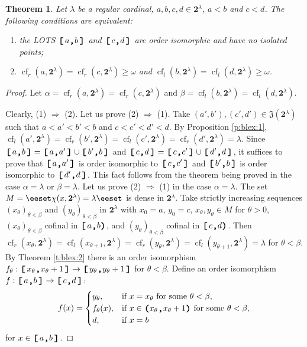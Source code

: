 \documentclass[preprint]{elsarticle}
\def\om{\omega}
\def\be{\beta}
\def\al{\alpha}
\def\la{\lambda}
\def\set#1{\bbset#1\eeset}
\def\bbset#1:#2\eeset{\{#1\,:\,#2\}}
\def\te{\theta}
\newtheorem{theorem}{Theorem}[section]
\theoremstyle{definition}
\theoremstyle{remark}
\def\rarr{\Rightarrow}
\def\cf{\operatorname{cf}}
\def\lex#1#2{\mathfrak{L}(#2^{#1})}
\def\lex#1#2{#2^{#1}}
\def\B{2}
\def\B{\mathsf{2}}
\def\B{\mathbf{2}}
\def\ilcomma/{\boldsymbol{,}}
\def\ilsymlp{\boldsymbol{(}}
\def\ilsymrp{\boldsymbol{)}}
\def\ilsymlc{\boldsymbol{[}}
\def\ilsymrc{\boldsymbol{]}}
\def\ilfont#1{\boldsymbol{#1}}
\def\ilfontX#1{\mathrm{\text{\texttt{\textbf{\large #1}}}}}
\def\ilfontX#1{{\text{\texttt{\textbf{\large \upshape #1}}}}}
\def\ilfont#1{\raisebox{-1.2pt}{\ilfontX{#1}}}
\def\ilfontC#1{\raisebox{-0.7pt}{\ilfontX{#1}}}
\def\ilcomma/{\ilfontC{,}}
\def\ilsymlp{\ilfont{(}}
\def\ilsymrp{\ilfont{)}}
\def\ilsymlc{\ilfont{[}\,}
\def\ilsymrc{\,\ilfont{]}}
\def\ilpp(#1,#2){\ilsymlp#1\ilcomma/ #2\ilsymrp}
\def\ilcp[#1,#2){\ilsymlc#1\ilcomma/ #2\ilsymrp}
\def\ilpc(#1,#2]{\ilsymlp#1\ilcomma/ #2\ilsymrc}
\def\ilcc[#1,#2]{\ilsymlc#1\ilcomma/ #2\ilsymrc}
\def\jumps#1{\mathfrak{J}(#1)}
\def\sq#1#2{(#1)_{#2}}
\def\lexab{\lex\la\B}
\begin{document}
\begin{theorem}\label{t:blex:3}
Let $\la$ be a regular cardinal, $a,b,c,d\in \lexab$, $a<b$ and $c<d$.
The following conditions are equivalent:
\begin{enumerate}
\item
the LOTS $\ilcc[a,b]$ and $\ilcc[c,d]$ are order isomorphic and have no isolated points;
\item
$\cf_r(a,\lexab)=\cf_r(c,\lexab)\geq \om$ and
$\cf_l(b,\lexab)=\cf_l(d,\lexab)\geq \om$.
\end{enumerate}
\end{theorem}
\begin{proof}
Let 
$\al=\cf_r(a,\lexab)=\cf_r(c,\lexab)$ and
$\be = \cf_l(b,\lexab)=\cf_l(d,\lexab)$.

Clearly, (1) $\rarr$ (2). Let us prove (2) $\rarr$ (1).
Take $(a',b'),(c',d')\in \jumps{\lexab}$ such that $a< a'<b'< b$ and $c< c'<d'< d$.
By Proposition \ref{p:blex:1}, $\cf_l(a',\lexab)=\cf_r(b',\lexab)=\cf_l(c',\lexab)=\cf_r(d',\lexab)=\la$. Since $\ilcc[a,b]=\ilcc[a,a']\cup \ilcc[b',b]$ and $\ilcc[c,d]=\ilcc[c,c']\cup \ilcc[d',d]$, it suffices to prove that $\ilcc[a,a']$ is order isomorphic to $\ilcc[c,c']$ and $\ilcc[b',b]$ is order isomorphic to $\ilcc[d',d]$. This fact follows from the theorem being proved in the case $\al=\la$ or $\be=\la$. Let us prove (2) $\rarr$ (1) in the case $\al=\la$. The set $M=\set{x\in\lexab: \pi\chi(x,\lexab)=\la}$ is dense in $\lexab$. Take strictly increasing sequences $\sq{x_\te}{\te<\be}$ and $\sq{y_\te}{\te<\be}$ in $\lexab$ with $x_0=a$, $y_0=c$, $x_\te,y_\te\in M$ for $\te>0$, $\sq{x_\te}{\te<\be}$ cofinal in $\ilcp[a,b)$, and $\sq{y_\te}{\te<\be}$ cofinal in $\ilcp[c,d)$. Then $\cf_r(x_\te,\lexab)=\cf_l(x_{\te+1},\lexab)=\cf_r(y_\te,\lexab)=\cf_l(y_{\te+1},\lexab)=\la$ for $\te<\be$. By Theorem \ref{t:blex:2} there is an order isomorphism $f_\te: \ilcc[x_\te,x_{\te+1}]\to \ilcc[y_\te,y_{\te+1}]$ for $\te<\be$. Define an order isomorphism $f: \ilcc[a,b]\to \ilcc[c,d]$:
\[
f(x)=\begin{cases}
y_\te, & \text{if }x=x_\te\text{ for some }\te<\be,
\\
f_\te(x), & \text{if }x\in \ilpp(x_\te,x_{\te+1})\text{ for some }\te<\be,
\\
d, & \text{if }x=b
\end{cases}
\]
for $x\in \ilcc[a,b]$.
\end{proof}





\end{document}
